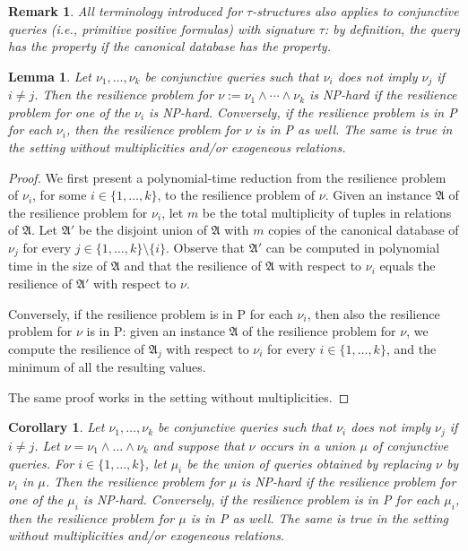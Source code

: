 \documentclass[nonacm]{acmart}
\newcommand{\bA}{{\mathfrak A}}
\newtheorem{lemma}[theorem]{Lemma}
\newtheorem{corollary}[theorem]{Corollary}
\newtheorem{remark}[theorem]{Remark}
\begin{document}
\begin{remark}\label{rem:db}
All terminology introduced for $\tau$-structures also applies to conjunctive queries (i.e., primitive positive formulas) with signature $\tau$: by definition, the query has the property if the canonical database has the property. 
\end{remark}

\begin{lemma}\label{lem:con-aux}
Let $\nu_1,\dots,\nu_k$ be conjunctive queries such that $\nu_i$ does not imply $\nu_j$ if $i \neq j$. 
Then the resilience problem for $\nu := \nu_1 \wedge \cdots \wedge \nu_k$ is NP-hard if the resilience problem for one of the $\nu_i$ is NP-hard.
Conversely, if the resilience problem is in P
for each $\nu_i$, then the resilience problem for $\nu$ is in P
as well. The same is true in the setting without multiplicities and/or exogeneous relations.
\end{lemma}

\begin{proof}
We first present a polynomial-time reduction from the resilience problem of $\nu_i$, for some $i \in \{1,\dots,k\}$, to the resilience problem of $\nu$. 
Given an instance $\bA$ of the resilience problem for $\nu_i$, let $m$ be the total multiplicity of tuples in relations of $\bA$. 
Let $\bA'$ be the disjoint union of $\bA$ with $m$ copies of the canonical database of $\nu_j$ for every $j \in \{1,\dots,k\} \setminus \{i\}$. 
Observe that $\bA'$ can be computed in polynomial time in the size of $\bA$ and that the resilience of $\bA$
with respect to $\nu_i$ equals the resilience of 
$\bA'$ with respect to $\nu$. 

Conversely, if the resilience problem is in P for each $\nu_i$,
then also the resilience problem for $\nu$ is in P: 
given an instance $\bA$ of the resilience problem for $\nu$, 
we compute the resilience of $\bA_j$ with respect to $\nu_i$ for every $i \in \{1,\dots,k\}$, and the minimum of all the resulting values.
 
The same proof works in the setting without multiplicities. 
\end{proof}

\begin{corollary}\label{cor:con}
Let $\nu_1,\dots,\nu_k$ be conjunctive queries such that $\nu_i$ does not imply $\nu_j$ if $i \neq j$.
Let $\nu = \nu_1 \wedge \dots \wedge \nu_k$ and suppose that $\nu$ occurs in a union $\mu$ of conjunctive queries. For $i \in \{1, \dots, k\}$, let $\mu_i$ be the union of queries obtained by replacing $\nu$ by $\nu_i$ in $\mu$. Then the resilience problem for $\mu$ is NP-hard if the resilience problem for one of the $\mu_i$ is NP-hard.
Conversely, if the resilience problem is in P
for each $\mu_i$, then the resilience problem for $\mu$ is in P as well.
The same is true in the setting without 
 multiplicities and/or  exogeneous relations.
\end{corollary}
\end{document}

